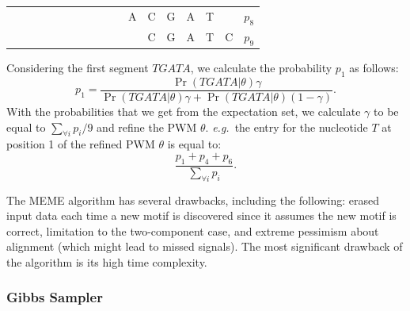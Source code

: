 \begin{center}
\begin{tabular}{cccccccccccccc}
~&\hspace{-4mm}~&\hspace{-4mm}~&\hspace{-4mm}~&\hspace{-4mm}~&\hspace{-4mm}~&\hspace{-4mm}~&\hspace{-4mm}A&\hspace{-4mm}C&\hspace{-4mm}G&\hspace{-4mm}A&\hspace{-4mm}T&\hspace{-4mm}~&$p_8$\\
~&\hspace{-4mm}~&\hspace{-4mm}~&\hspace{-4mm}~&\hspace{-4mm}~&\hspace{-4mm}~&\hspace{-4mm}~&\hspace{-4mm}~&\hspace{-4mm}C&\hspace{-4mm}G&\hspace{-4mm}A&\hspace{-4mm}T&\hspace{-4mm}C&$p_9$\\
\end{tabular}
\end{center}

\noindent Considering the first segment $TGATA$, we calculate the probability $p_1$ as follows: $$p_1 = \frac{\Pr(TGATA | \theta)\gamma}{\Pr(TGATA | \theta)\gamma + \Pr(TGATA | \theta)(1 - \gamma)}.$$  With the probabilities that we get from the expectation set, we calculate $\gamma$ to be equal to $\sum_{\forall i} p_i / 9$ and refine the PWM $\theta$. {\em e.g.}\ the entry for the nucleotide $T$ at position 1 of the refined PWM $\theta$ is equal to: $$\frac{p_1 + p_4 + p_6}{ \sum_{\forall i} p_i}.$$
 
The MEME algorithm has several drawbacks, including the following:  erased input data each time a new motif is discovered since it assumes the new motif is correct, limitation to the two-component case, and extreme pessimism about alignment (which might lead to missed signals).  The most significant drawback of the algorithm is its high time complexity.  

\subsubsection{Gibbs Sampler}



